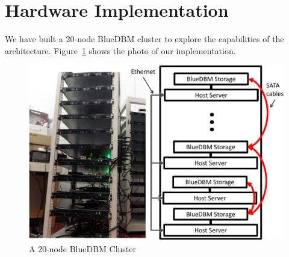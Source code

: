 \section{Hardware Implementation}
\label{sec:implementation}

We have built a 20-node BlueDBM cluster to explore the capabilities of the
architecture. Figure~\ref{fig:bluedbmcluster} shows the photo of our
implementation.

\begin{figure}[ht]
	\begin{center}
	\includegraphics[width=0.4\paperwidth]{figures/rackserver-crop.pdf}
	\caption{A 20-node BlueDBM Cluster}
	\label{fig:bluedbmcluster}
	\end{center}
\end{figure}

%

